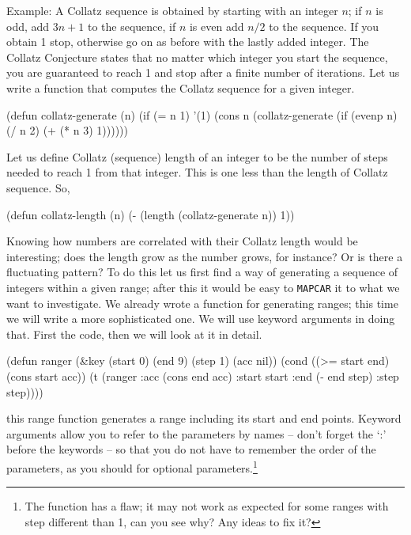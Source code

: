 \documentclass[a4paper,11pt]{article}
\begin{document}
\begin{uenum}
\item Example: A Collatz sequence is obtained by starting with an integer $n$; if $n$ is odd, add $3n + 1$ to the sequence, if $n$ is even add $n/2$ to the sequence. If you obtain 1 stop, otherwise go on as before with the lastly added integer. The Collatz Conjecture states that no matter which integer you start the sequence, you are guaranteed to reach 1 and stop after a finite number of iterations. Let us write a function that computes the Collatz sequence for a given integer.

\begin{lispcode}
(defun collatz-generate (n)
  (if (= n 1) 
	'(1)
	(cons n (collatz-generate (if (evenp n)
								(/ n 2)
								(+ (* n 3) 1))))))
\end{lispcode}

\item Let us define Collatz (sequence) length of an integer to be the number of steps needed to reach 1 from that integer. This is one less than the length of Collatz sequence. So,

\begin{lispcode}
(defun collatz-length (n)
  (- (length (collatz-generate n)) 1))
\end{lispcode}

\item Knowing how numbers are correlated with their Collatz length would be interesting; does the length grow as the number grows, for instance? Or is there a fluctuating pattern? To do this let us first find a way of generating a sequence of integers within a given range; after this it would be easy to \Verb+MAPCAR+ it to what we want to investigate. We already wrote a function for generating ranges; this time we will write a more sophisticated one. We will use keyword arguments in doing that. First the code, then we will look at it in detail.

\begin{lispcode}
(defun ranger (&key (start 0) (end 9) (step 1) (acc nil))
  (cond ((>= start end) (cons start acc))
		(t (ranger :acc (cons end acc)
				   :start start
				   :end (- end step)
				   :step step))))
\end{lispcode}
this range function generates a range including its start and end points. Keyword arguments allow you to refer to the parameters by names -- don't forget the `:' before the keywords -- so that you do not have to remember the order of the parameters, as you should for optional parameters.\footnote{The function has a flaw; it may not work as expected for some ranges with step different than 1, can you see why? Any ideas to fix it?}


\end{uenum}
\end{document}
